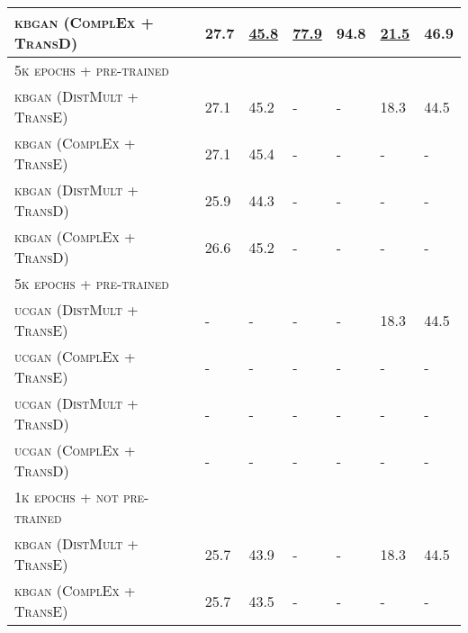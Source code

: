 \begin{table}[h]
\begin{tabular}{lllllll}
        \textsc{kbgan} (\textsc{ComplEx} + \textsc{TransD})   
        & 27.7 & \textbf{\underline{45.8}} & \underline{77.9}
        & 94.8 & \underline{21.5} & 46.9\\
        
         \midrule
          
          \textsc{5k epochs + pre-trained} 
          &  &  &  &  &  & \\
          
          \textsc{kbgan} (\textsc{DistMult} + \textsc{TransE})  & 27.1  & 45.2 & - & - & 18.3 & 44.5 \\
          
          \textsc{kbgan} (\textsc{ComplEx} + \textsc{TransE})  & 27.1  & 45.4 & - & - & - & - \\
          
          \textsc{kbgan} (\textsc{DistMult} + \textsc{TransD})  & 25.9  & 44.3 & - & - & - & - \\

          \textsc{kbgan} (\textsc{ComplEx} + \textsc{TransD})  & 26.6 & 45.2 & - & - & - & - \\
          
          \midrule
          
          \textsc{5k epochs + pre-trained} 
          &  &  &  &  &  & \\
          
          \textsc{ucgan} (\textsc{DistMult} + \textsc{TransE})  & - & - & - & - & 18.3 & 44.5 \\
          
          \textsc{ucgan} (\textsc{ComplEx} + \textsc{TransE})  & -  & - & - & - & - & - \\
          
          \textsc{ucgan} (\textsc{DistMult} + \textsc{TransD})  & -  & - & - & - & - & - \\

          \textsc{ucgan} (\textsc{ComplEx} + \textsc{TransD})  & -  & - & - & - & - & - \\
          
          \midrule
        \textsc{1k epochs + not pre-trained} 
          &  &  &  &  &  & \\
          
          \textsc{kbgan} (\textsc{DistMult} + \textsc{TransE})  & 25.7 & 43.9 & - & - & 18.3 & 44.5 \\
          
          \textsc{kbgan} (\textsc{ComplEx} + \textsc{TransE})  & 25.7 & 43.5 & - & - & - & - \\
          

\end{tabular}
\end{table}
